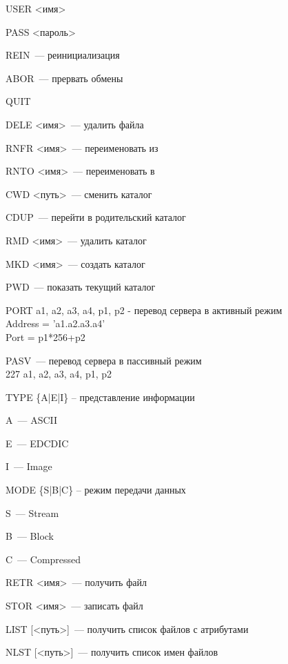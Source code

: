 \begin{MyItemize}
    \item USER <имя>
    \item PASS <пароль>
    \item REIN~--- реинициализация
    \item ABOR~--- прервать обмены
    \item QUIT
    \item DELE <имя>~--- удалить файла
    \item RNFR <имя>~--- переименовать из
    \item RNTO <имя>~--- переименовать в
    \item CWD <путь>~--- сменить каталог
    \item CDUP~--- перейти в родительский каталог
    \item RMD <имя>~--- удалить каталог
    \item MKD <имя>~--- создать каталог
    \item PWD~--- показать текущий каталог
    \item PORT a1, a2, a3, a4, p1, p2 - перевод сервера в активный режим\\
    Address = 'a1.a2.a3.a4'\\
    Port = p1*256+p2
    \item PASV~--- перевод сервера в пассивный режим\\
    227 a1, a2, a3, a4, p1, p2
    \item TYPE \{A|E|I\} – представление информации
    \begin{MyItemize}
        \item A~--- ASCII
        \item E~--- EDCDIC
        \item I~--- Image
    \end{MyItemize}
    \item MODE \{S|B|C\} – режим передачи данных
    \begin{MyItemize}
        \item S~--- Stream
        \item B~--- Block
        \item C~--- Compressed
    \end{MyItemize}
    \item RETR <имя>~--- получить файл
    \item STOR <имя>~--- записать файл
    \item LIST [<путь>]~--- получить список файлов с атрибутами
    \item NLST [<путь>]~--- получить список имен файлов
\end{MyItemize}

